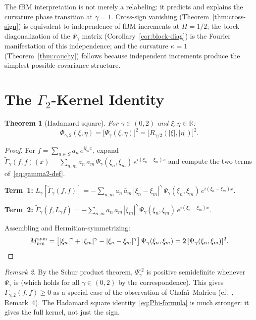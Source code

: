 \documentclass[11pt,a4paper]{article}
\theoremstyle{plain}
\newtheorem{theorem}{Theorem}[section]
\theoremstyle{definition}
\theoremstyle{remark}
\newtheorem{remark}[theorem]{Remark}
\newcommand{\R}{\mathbb{R}}
\begin{document}
The fBM interpretation is not merely a relabeling: it predicts and
explains the curvature phase transition at $\gamma = 1$.
Cross-sign vanishing (Theorem~\ref{thm:cross-sign}) is equivalent
to independence of fBM increments at $H = 1/2$; the block
diagonalization of the $\Psi_\gamma$ matrix
(Corollary~\ref{cor:block-diag}) is the Fourier manifestation
of this independence; and the curvature $\kappa = 1$
(Theorem~\ref{thm:cauchy}) follows because independent increments
produce the simplest possible covariance structure.


\section{The $\Gamma_2$-Kernel Identity}\label{sec:gamma2}

\begin{theorem}[Hadamard square]\label{thm:gamma2-kernel}
For $\gamma \in (0,2)$ and $\xi,\eta \in \R$:
\begin{equation}\label{eq:Phi-formula}
  \Phi_{\gamma,2}(\xi,\eta) = \bigl[\Psi_\gamma(\xi,\eta)\bigr]^2
  = \bigl[R_{\gamma/2}(|\xi|,|\eta|)\bigr]^2.
\end{equation}
\end{theorem}

\begin{proof}
For $f = \sum_{n \in S} a_n\,e^{i\xi_n x}$, expand
$\widetilde{\Gamma}_\gamma(f,f)(x)
= \sum_{n,m} a_n\,\bar{a}_m\,\Psi_\gamma(\xi_n,\xi_m)\,
  e^{i(\xi_n-\xi_m)x}$
and compute the two terms of~\eqref{eq:gamma2-def}.

\textbf{Term~1:}
$L_\gamma[\widetilde{\Gamma}_\gamma(f,f)] =
-\sum_{n,m} a_n\,\bar{a}_m\,|\xi_n-\xi_m|^\gamma\,
\Psi_\gamma(\xi_n,\xi_m)\,e^{i(\xi_n-\xi_m)x}$.

\textbf{Term~2:}
$\widetilde{\Gamma}_\gamma(f, L_\gamma f) =
-\sum_{n,m} a_n\,\bar{a}_m\,|\xi_m|^\gamma\,
\Psi_\gamma(\xi_n,\xi_m)\,e^{i(\xi_n-\xi_m)x}$.

Assembling and Hermitian-symmetrizing:
\[
  M_{nm}^{\mathrm{sym}}
  = \bigl[|\xi_n|^\gamma + |\xi_m|^\gamma - |\xi_n-\xi_m|^\gamma\bigr]\,
  \Psi_\gamma(\xi_n,\xi_m)
  = 2\,[\Psi_\gamma(\xi_n,\xi_m)]^2. \qedhere
\]
\end{proof}

\begin{remark}\label{rem:hadamard}
By the Schur product theorem, $\Psi_\gamma^{\circ 2}$ is positive
semidefinite whenever $\Psi_\gamma$ is (which holds for all
$\gamma \in (0,2)$ by the correspondence). This gives $\Gamma_{\gamma,2}(f,f) \geq 0$
as a special case of the observation of Chafa\"i--Malrieu
(cf.~\cite{GentilImbert2008}, Remark~4). The Hadamard square
identity~\eqref{eq:Phi-formula} is much stronger: it gives the
full kernel, not just the sign.
\end{remark}
\end{document}
